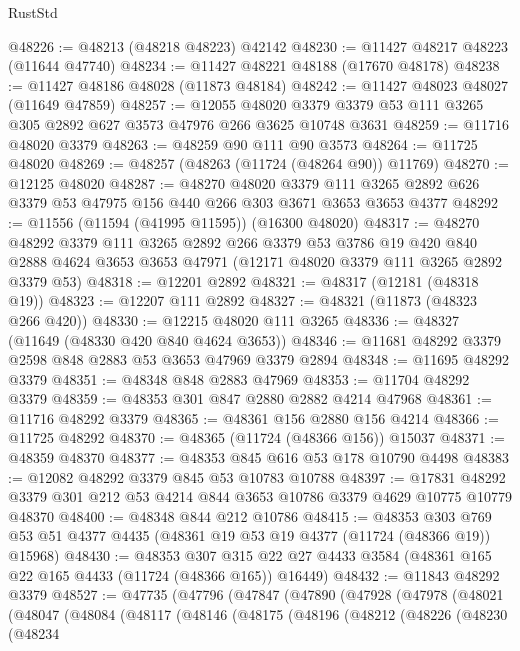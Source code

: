 \begin{lexlean}{RustStd}
\begin{coremodule}
@48226 := @48213 (@48218 @48223) @42142
@48230 := @11427 @48217 @48223 (@11644 @47740)
@48234 := @11427 @48221 @48188 (@17670 @48178)
@48238 := @11427 @48186 @48028 (@11873 @48184)
@48242 := @11427 @48023 @48027 (@11649 @47859)
@48257 := @12055
    @48020
    @3379
    @3379
    @53
    @111
    @3265
    @305
    @2892
    @627
    @3573
    @47976
    @266
    @3625
    @10748
    @3631
@48259 := @11716 @48020 @3379
@48263 := @48259 @90 @111 @90 @3573
@48264 := @11725 @48020
@48269 := @48257 (@48263 (@11724 (@48264 @90)) @11769)
@48270 := @12125 @48020
@48287 := @48270
    @48020
    @3379
    @111
    @3265
    @2892
    @626
    @3379
    @53
    @47975
    @156
    @440
    @266
    @303
    @3671
    @3653
    @3653
    @4377
@48292 := @11556 (@11594 (@41995 @11595)) (@16300 @48020)
@48317 := @48270
    @48292
    @3379
    @111
    @3265
    @2892
    @266
    @3379
    @53
    @3786
    @19
    @420
    @840
    @2888
    @4624
    @3653
    @3653
    @47971
    (@12171 @48020 @3379 @111 @3265 @2892 @3379 @53)
@48318 := @12201 @2892
@48321 := @48317 (@12181 (@48318 @19))
@48323 := @12207 @111 @2892
@48327 := @48321 (@11873 (@48323 @266 @420))
@48330 := @12215 @48020 @111 @3265
@48336 := @48327 (@11649 (@48330 @420 @840 @4624 @3653))
@48346 := @11681 @48292 @3379 @2598 @848 @2883 @53 @3653 @47969 @3379 @2894
@48348 := @11695 @48292 @3379
@48351 := @48348 @848 @2883 @47969
@48353 := @11704 @48292 @3379
@48359 := @48353 @301 @847 @2880 @2882 @4214 @47968
@48361 := @11716 @48292 @3379
@48365 := @48361 @156 @2880 @156 @4214
@48366 := @11725 @48292
@48370 := @48365 (@11724 (@48366 @156)) @15037
@48371 := @48359 @48370
@48377 := @48353 @845 @616 @53 @178 @10790 @4498
@48383 := @12082 @48292 @3379 @845 @53 @10783 @10788
@48397 := @17831 @48292 @3379 @301 @212 @53 @4214 @844 @3653 @10786 @3379 @4629 @10775 @10779 @48370
@48400 := @48348 @844 @212 @10786
@48415 := @48353
    @303
    @769
    @53
    @51
    @4377
    @4435
    (@48361 @19 @53 @19 @4377 (@11724 (@48366 @19)) @15968)
@48430 := @48353
    @307
    @315
    @22
    @27
    @4433
    @3584
    (@48361 @165 @22 @165 @4433 (@11724 (@48366 @165)) @16449)
@48432 := @11843 @48292 @3379
@48527 := @47735
    (@47796
      (@47847
        (@47890
          (@47928
            (@47978
              (@48021
                (@48047
                  (@48084
                    (@48117
                      (@48146
                        (@48175
                          (@48196
                            (@48212
                              (@48226
                                (@48230
                                  (@48234

\end{coremodule}
\end{lexlean}
